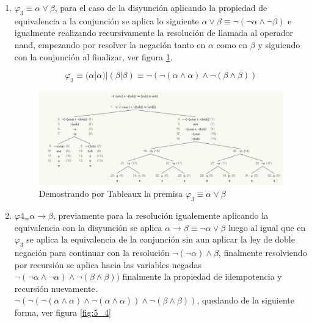 \documentclass{article}
\begin{document}
\begin{enumerate}
\begin{enumerate}
    		\item $\varphi_3 \equiv \alpha\lor\beta$, para el caso de la disyunción aplicando la propiedad de equivalencia a la conjunción se aplica lo siguiente $\alpha \lor \beta \equiv \neg(  \neg \alpha \land \neg \beta)$ e igualmente realizando recursivamente la resolución de llamada al operador nand, empezando por resolver la negación tanto en $\alpha$ como en $\beta$ y siguiendo con la conjunción al finalizar, ver figura \ref{fig:5_3}.
    		
    		\begin{equation}
		        \varphi_3 \equiv (\alpha | \alpha) | (\beta | \beta) \equiv \neg ( \neg (\alpha \land \alpha) \land \neg ( \beta \land \beta)) 
		    \end{equation}
		    
		    \begin{figure}[H]
    			\centering
    			\includegraphics[scale=0.48]{img/5_3.png}
    			\caption{Demostrando por Tableaux la premisa $\varphi_3 \equiv \alpha\lor\beta$}
    			\label{fig:5_3}
    		\end{figure}
    		
    		
    		\item $\varphi4_ \equiv \alpha \to \beta$, previamente para la resolución igualemente aplicando la equivalencia con la disyunción se aplica $\alpha \to \beta \equiv \neg \alpha \lor \beta$ luego al igual que en $\varphi_3$ se aplica la equivalencia de la conjunción sin aun aplicar la ley de doble negación para continuar con la resolución $\neg (\neg \alpha) \land \beta$, finalmente resolviendo por recursión se aplica hacia las variables negadas $\neg (\neg \alpha \land \neg \alpha) \land \neg (\beta \land \beta))$ finalmente la propiedad de idempotencia y recursión nuevamente. \\
    		$ \neg(\neg (\neg (\alpha \land \alpha) \land \neg (\alpha \land \alpha)) \land \neg (\beta \land \beta))$, quedando de la siguiente forma, ver figura \ref{fig:5_4}
    		

\end{enumerate}
\end{enumerate}
\end{document}
